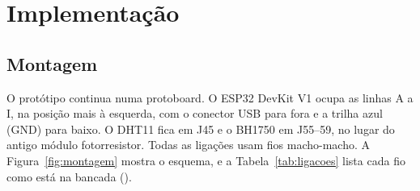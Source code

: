 \chapter{Implementação}
\label{cap:implementacao}
\rubricaFuncionalidade

\section{Montagem}

O protótipo continua numa protoboard. O ESP32 DevKit V1 ocupa as linhas
A a I, na posição mais à esquerda, com o conector USB para fora e a
trilha azul (GND) para baixo. O DHT11 fica em J45 e o BH1750 em J55--59,
no lugar do antigo módulo fotorresistor. Todas as ligações usam fios
macho-macho. A Figura~\ref{fig:montagem} mostra o esquema, e a
Tabela~\ref{tab:ligacoes} lista cada fio como está na bancada
().

